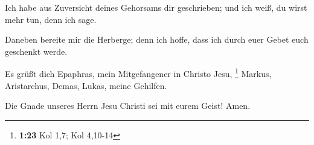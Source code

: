  Ich habe aus Zuversicht deines Gehorsams dir
geschrieben; und ich weiß, du wirst mehr tun, denn ich sage.

 Daneben bereite mir die Herberge; denn ich hoffe, dass
ich durch euer Gebet euch geschenkt werde.

 Es grüßt dich Epaphras, mein Mitgefangener in Christo
Jesu, \footnote{\textbf{1:23} Kol 1,7; Kol 4,10-14} 
Markus, Aristarchus, Demas, Lukas, meine Gehilfen.

 Die Gnade unseres Herrn Jesu Christi sei mit eurem
Geist! Amen.
